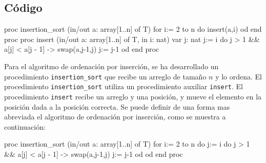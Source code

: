 \subsection{Código}

\begin{pascallike}
proc insertion_sort (in/out a: array[1..n] of T)
    for i:= 2 to n do
        insert(a,i)
    od
end proc
proc insert (in/out a: array[1..n] of T, in i: nat)
    var j: nat
    j:= i
    do j > 1 && a[j] < a[j - 1] -> 
        swap(a,j-1,j)
        j:= j-1
    od
end proc
\end{pascallike}

Para el algoritmo de ordenación por inserción, se ha desarrollado un procedimiento \texttt{insertion\_sort} que recibe un arreglo de tamaño $n$ y lo ordena. El procedimiento \texttt{insertion\_sort} utiliza un procedimiento auxiliar \texttt{insert}. El procedimiento \texttt{insert} recibe un arreglo y una posición, y mueve el elemento en la posición dada a la posición correcta. Se puede definir de una forma mas abreviada el algoritmo de ordenación por inserción, como se muestra a continuación:

\begin{pascallike}
proc insertion_sort (in/out a: array[1..n] of T)
    for i:= 2 to n do
        j:= i
        do j > 1 && a[j] < a[j - 1] -> 
            swap(a,j-1,j)
            j:= j-1
        od
    od
end proc
\end{pascallike}